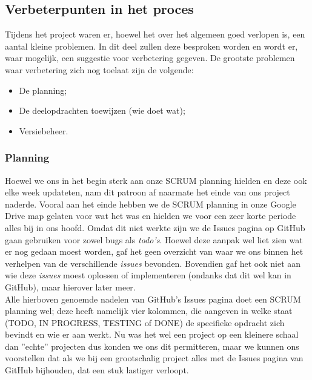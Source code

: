 \documentclass[a4paper,11pt,titlepage]{scrartcl}
\begin{document}
\newpage\subsection{Verbeterpunten in het proces}
Tijdens het project waren er, hoewel het over het algemeen goed verlopen is, een aantal kleine problemen. In dit deel zullen deze besproken worden en wordt er, waar mogelijk, een suggestie voor verbetering gegeven. De grootste problemen waar verbetering zich nog toelaat zijn de volgende:
\begin{itemize}
	\item De planning;
	\item De deelopdrachten toewijzen (wie doet wat);
	\item Versiebeheer.
\end{itemize}

\subsubsection{Planning}
Hoewel we ons in het begin sterk aan onze SCRUM planning hielden en deze ook elke week updateten, nam dit patroon af naarmate het einde van ons project naderde. Vooral aan het einde hebben we de SCRUM planning in onze Google Drive map gelaten voor wat het was en hielden we voor een zeer korte periode alles bij in ons hoofd. Omdat dit niet werkte zijn we de Issues pagina op GitHub gaan gebruiken voor zowel bugs als \textit{todo's}. Hoewel deze aanpak wel liet zien wat er nog gedaan moest worden, gaf het geen overzicht van waar we ons binnen het verhelpen van de verschillende \textit{issues} bevonden. Bovendien gaf het ook niet aan wie deze \textit{issues} moest oplossen of implementeren (ondanks dat dit wel kan in GitHub), maar hierover later meer.\\

Alle hierboven genoemde nadelen van GitHub's Issues pagina doet een SCRUM planning wel; deze heeft namelijk vier kolommen, die aangeven in welke staat (TODO, IN PROGRESS, TESTING of DONE) de specifieke opdracht zich bevindt en wie er aan werkt. Nu was het wel een project op een kleinere schaal dan ''echte'' projecten dus konden we ons dit permitteren, maar we kunnen ons voorstellen dat als we bij een grootschalig project alles met de Issues pagina van GitHub bijhouden, dat een stuk lastiger verloopt.
\end{document}
